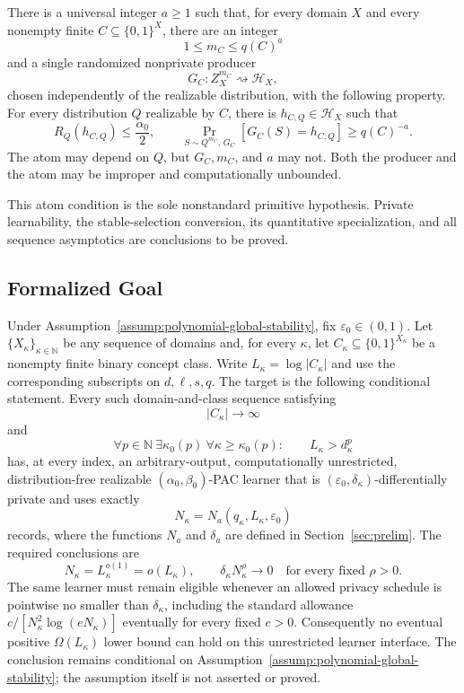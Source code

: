 \begin{assumption}
\label{assump:polynomial-global-stability}
There is a universal integer \(a\geq1\) such that, for every domain
\(X\) and every nonempty finite \(C\subseteq\{0,1\}^X\), there are an
integer
\[
1\leq m_C\leq q(C)^a
\]
and a single randomized nonprivate producer
\[
G_C:Z_X^{m_C}\rightsquigarrow\mathcal H_X,
\]
chosen independently of the realizable distribution, with the
following property.  For every distribution \(Q\) realizable by
\(C\), there is \(h_{C,Q}\in\mathcal H_X\) such that
\[
R_Q(h_{C,Q})\leq\frac{\alpha_0}{2},
\qquad
\Pr_{S\sim Q^{m_C},\,G_C}[G_C(S)=h_{C,Q}]
\geq q(C)^{-a}.
\tag{GS}
\]
The atom may depend on \(Q\), but \(G_C,m_C\), and \(a\) may not.
Both the producer and the atom may be improper and computationally
unbounded.
\end{assumption}

This atom condition is the sole nonstandard primitive hypothesis.
Private learnability, the stable-selection conversion, its
quantitative specialization, and all sequence asymptotics are
conclusions to be proved.

\subsection{Formalized Goal}

Under Assumption~\ref{assump:polynomial-global-stability}, fix
\(\varepsilon_0\in(0,1)\).  Let
\(\{X_\kappa\}_{\kappa\in\mathbb N}\) be any sequence of domains and,
for every \(\kappa\), let
\(C_\kappa\subseteq\{0,1\}^{X_\kappa}\) be a nonempty finite binary
concept class.  Write \(L_\kappa=\log|C_\kappa|\) and use the
corresponding subscripts on \(d,\ell,s,q\).  The target is the following
conditional statement.  Every such domain-and-class sequence satisfying
\[
|C_\kappa|\longrightarrow\infty
\]
and
\[
\forall p\in\mathbb N\ \exists\kappa_0(p)\
\forall\kappa\geq\kappa_0(p):
\qquad L_\kappa>d_\kappa^p
\tag{SP}
\]
has, at every index, an arbitrary-output, computationally
unrestricted, distribution-free realizable
\((\alpha_0,\beta_0)\)-PAC learner that is
\((\varepsilon_0,\delta_\kappa)\)-differentially private and uses
exactly
\[
N_\kappa=N_a(q_\kappa,L_\kappa,\varepsilon_0)
\]
records, where the functions \(N_a\) and \(\delta_a\) are defined in
Section~\ref{sec:prelim}.  The required conclusions are
\[
N_\kappa=L_\kappa^{o(1)}=o(L_\kappa),
\qquad
\delta_\kappa N_\kappa^\rho\longrightarrow0
\quad\text{for every fixed }\rho>0.
\]
The same learner must remain eligible whenever an allowed privacy
schedule is pointwise no smaller than \(\delta_\kappa\), including
the standard allowance
\(c/[N_\kappa^2\log(eN_\kappa)]\) eventually for every fixed
\(c>0\).  Consequently no eventual positive
\(\Omega(L_\kappa)\) lower bound can hold on this unrestricted learner
interface.  The conclusion remains conditional on
Assumption~\ref{assump:polynomial-global-stability}; the assumption
itself is not asserted or proved.

